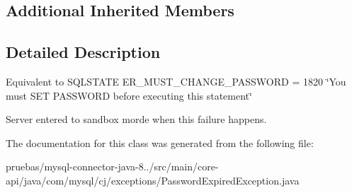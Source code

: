 \subsection*{Additional Inherited Members}


\subsection{Detailed Description}
Equivalent to S\+Q\+L\+S\+T\+A\+TE E\+R\+\_\+\+M\+U\+S\+T\+\_\+\+C\+H\+A\+N\+G\+E\+\_\+\+P\+A\+S\+S\+W\+O\+RD = 1820 \char`\"{}\+You must S\+E\+T P\+A\+S\+S\+W\+O\+R\+D before executing this statement\char`\"{}

Server entered to sandbox morde when this failure happens. 

The documentation for this class was generated from the following file\+:\begin{DoxyCompactItemize}
\item 
pruebas/mysql-\/connector-\/java-\/8../src/main/core-\/api/java/com/mysql/cj/exceptions/Password\+Expired\+Exception.\+java\end{DoxyCompactItemize}
